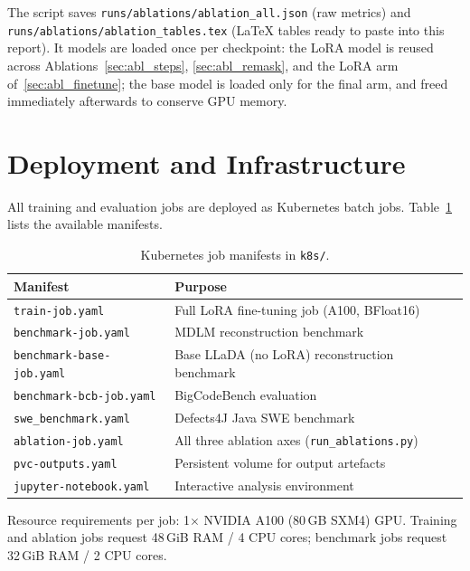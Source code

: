 \documentclass[11pt,a4paper]{article}
\begin{document}
The script saves \texttt{runs/ablations/ablation\_all.json} (raw metrics) and
\texttt{runs/ablations/ablation\_tables.tex} (LaTeX tables ready to paste into
this report). It models are loaded once per checkpoint: the LoRA model is
reused across Ablations~\ref{sec:abl_steps}, \ref{sec:abl_remask}, and the
LoRA arm of~\ref{sec:abl_finetune}; the base model is loaded only for the
final arm, and freed immediately afterwards to conserve GPU memory.

\section{Deployment and Infrastructure}
\label{sec:infra}

All training and evaluation jobs are deployed as Kubernetes batch jobs. Table~\ref{tab:k8s} lists the available manifests.

\begin{table}[H]
\centering
\caption{Kubernetes job manifests in \texttt{k8s/}.}
\label{tab:k8s}
\renewcommand{\arraystretch}{1.2}
\begin{tabular}{ll}
\toprule
\textbf{Manifest} & \textbf{Purpose} \\
\midrule
\texttt{train-job.yaml}          & Full LoRA fine-tuning job (A100, BFloat16) \\
\texttt{benchmark-job.yaml}      & MDLM reconstruction benchmark \\
\texttt{benchmark-base-job.yaml} & Base LLaDA (no LoRA) reconstruction benchmark \\
\texttt{benchmark-bcb-job.yaml}  & BigCodeBench evaluation \\
\texttt{swe\_benchmark.yaml}     & Defects4J Java SWE benchmark \\
\texttt{ablation-job.yaml}       & All three ablation axes (\texttt{run\_ablations.py}) \\
\texttt{pvc-outputs.yaml}        & Persistent volume for output artefacts \\
\texttt{jupyter-notebook.yaml}   & Interactive analysis environment \\
\bottomrule
\end{tabular}
\end{table}

Resource requirements per job: 1$\times$ NVIDIA A100 (80\,GB SXM4) GPU.
Training and ablation jobs request 48\,GiB RAM / 4 CPU cores; benchmark jobs
request 32\,GiB RAM / 2 CPU cores.
\end{document}
